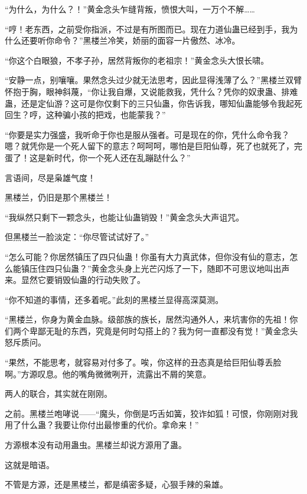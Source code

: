 
\begin{this_body}



“为什么，为什么？！”黄金念头乍缝背叛，愤恨大叫，一万个不解……

“哼！老东西，之前受你指派，不过是有所图而已。现在力道仙蛊已经到手，我为什么还要听你命令？”黑楼兰冷笑，娇丽的面容一片傲然、冰冷。

“你这个白眼狼，不孝子孙，居然背叛你的老祖宗！”黄金念头大恨长啸。

“安静一点，别嚷嚷。果然念头过少就无法思考，因此显得浅薄了么？”黑楼兰双臂怀抱于胸，眼神斜蔑，“你让我自爆，又说能救我，凭什么？凭你的奴隶蛊、排难蛊，还是定仙游？这可是你仅剩下的三只仙蛊，你告诉我，哪知仙蛊能够令我起死回生？哼，这种骗小孩的把戏，也能蒙我？”

“你要是实力强盛，我听命于你也是服从强者。可是现在的你，凭什么命令我？嗯？就凭你是一个死人留下的意志？呵呵呵，哪怕是巨阳仙尊，死了也就死了，完蛋了！这是新时代，你一个死人还在乱蹦跶什么？”

言语间，尽是枭雄气度！

黑楼兰，仍旧是那个黑楼兰！

“我纵然只剩下一颗念头，也能让仙蛊销毁！”黄金念头大声诅咒。

但黑楼兰一脸淡定：“你尽管试试好了。”

“怎么可能？你居然镇压了四只仙蛊！你虽有大力真武体，但你没有仙的意志，怎么能镇压住四只仙蛊？”黄金念头身上光芒闪烁了一下，随即不可思议地叫出声来。显然它要销毁仙蛊的行动失败了。

“你不知道的事情，还多着呢。”此刻的黑楼兰显得高深莫测。

“黑楼兰，你身为黄金血脉。级部族的族长，居然沟通外人，来坑害你的先祖！你们两个卑鄙无耻的东西，究竟是何时勾搭上的？我为何一直都没有觉！”黄金念头怒斥质问。

“果然，不能思考，就容易对付多了。唉，你这样的丑态真是给巨阳仙尊丢脸啊。”方源叹息。他的嘴角微微咧开，流露出不屑的笑意。

两人的联合，其实就在刚刚。

之前。黑楼兰咆哮说——“魔头，你倒是巧舌如簧，狡诈如狐！可恨，你刚刚对我用了什么蛊？我要让你付出最惨重的代价。拿命来！”

方源根本没有动用蛊虫。黑楼兰却说方源用了蛊。

这就是暗语。

不管是方源，还是黑楼兰，都是缜密多疑，心狠手辣的枭雄。


\end{this_body}
